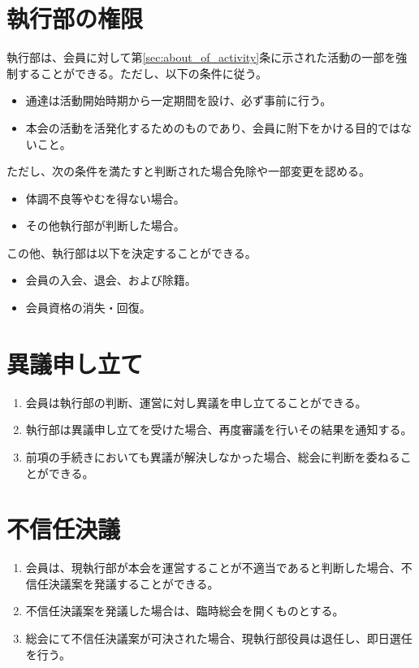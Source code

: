 \documentclass{jsreport}
\begin{document}
\section{執行部の権限}
執行部は、会員に対して第\ref{sec:about_of_activity}条に示された活動の一部を強制することができる。ただし、以下の条件に従う。
\begin{itemize}
    \item 通達は活動開始時期から一定期間を設け、必ず事前に行う。
    \item 本会の活動を活発化するためのものであり、会員に附下をかける目的ではないこと。
\end{itemize}
ただし、次の条件を満たすと判断された場合免除や一部変更を認める。
\begin{itemize}
    \item 体調不良等やむを得ない場合。
    \item その他執行部が判断した場合。
\end{itemize}
この他、執行部は以下を決定することができる。
\begin{itemize}
    \item 会員の入会、退会、および除籍。
    \item 会員資格の消失・回復。
\end{itemize}

\section{異議申し立て}
\begin{enumerate}
    \item 会員は執行部の判断、運営に対し異議を申し立てることができる。
    \item 執行部は異議申し立てを受けた場合、再度審議を行いその結果を通知する。
    \item 前項の手続きにおいても異議が解決しなかった場合、総会に判断を委ねることができる。
\end{enumerate}

\section{不信任決議}
\begin{enumerate}
    \item 会員は、現執行部が本会を運営することが不適当であると判断した場合、不信任決議案を発議することができる。
    \item 不信任決議案を発議した場合は、臨時総会を開くものとする。
    \item 総会にて不信任決議案が可決された場合、現執行部役員は退任し、即日選任を行う。
\end{enumerate}
\end{document}
